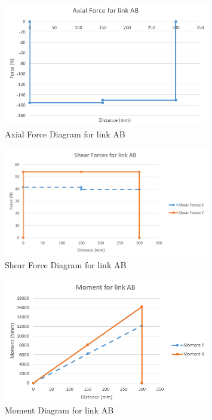 \begin{figure}[H]
    \centering
    \includegraphics[width=0.8\textwidth]{7_Appendices/Images/AB_Axial.PNG}
    \caption{Axial Force Diagram for link AB}
    \label{fig:annex_limb_AB_axial}
\end{figure}
\begin{figure}[H]
    \centering
    \includegraphics[width=0.8\textwidth]{7_Appendices/Images/AB_Shear.PNG}
    \caption{Shear Force Diagram for link AB}
    \label{fig:annex_limb_AB_shear}
\end{figure}
\begin{figure}[H]
    \centering
    \includegraphics[width=0.8\textwidth]{7_Appendices/Images/AB_Moment.PNG}
    \caption{Moment Diagram for link AB}
    \label{fig:annex_limb_AB_moment}
\end{figure}
